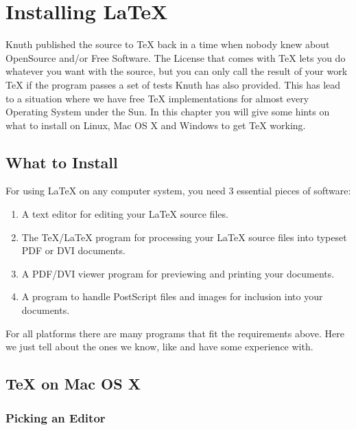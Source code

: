\appendix
\chapter{Installing \LaTeX}
\begin{intro}
Knuth published the source to \TeX{} back in a time when nobody knew
about OpenSource and/or Free Software. The License that comes with \TeX{}
lets you do whatever you want with the source, but you can only call the
result of your work \TeX{} if the program passes a set of tests Knuth has
also provided. This has lead to a situation where we have free \TeX{}
implementations for almost every Operating System under the Sun. In this chapter
you will give some hints on what to install on Linux, Mac OS X and Windows to
get \TeX{} working.
\end{intro}

\section{What to Install}

For using LaTeX on any computer system, you need 3 essential pieces of
software:

\begin{enumerate}

\item A text editor for editing your LaTeX source files.

\item The \TeX{}/\LaTeX{} program for processing your \LaTeX{} source files
into typeset PDF or DVI documents.

\item A PDF/DVI viewer program for previewing and printing your
documents.

\item A program to handle PostScript files and images for inclusion into
your documents.

\end{enumerate}

For all platforms there are many programs that fit the requirements above.
Here we just tell about the ones we know, like and have some experience
with.

\section{\TeX{} on Mac OS X}

\subsection{Picking an Editor}

